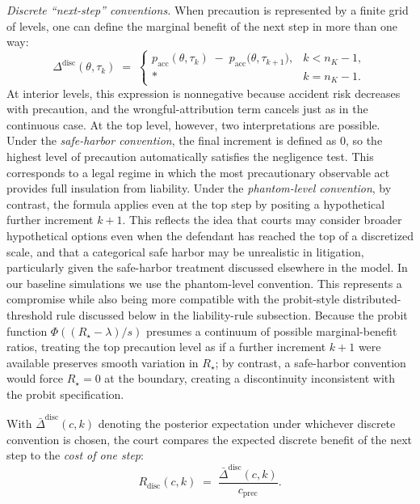 \documentclass{article}
\begin{document}
\medskip
\noindent\emph{Discrete “next-step” conventions.}
When precaution is represented by a finite grid of levels, one can define the marginal benefit of the next step in more than one way:
\[
\Delta^{\mathrm{disc}}(\theta,\tau_k)\;=\;
\begin{cases}
p_{\mathrm{acc}}(\theta,\tau_k)\;-\;p_{\mathrm{acc}}\!\bigl(\theta,\tau_{k+1}\bigr), & k<n_K-1,\\[4pt]
\ast & k=n_K-1.
\end{cases}
\]
At interior levels, this expression is nonnegative because accident risk decreases with precaution, and the wrongful-attribution term cancels just as in the continuous case. At the top level, however, two interpretations are possible. Under the \emph{safe-harbor convention}, the final increment is defined as \(0\), so the highest level of precaution automatically satisfies the negligence test. This corresponds to a legal regime in which the most precautionary observable act provides full insulation from liability. Under the \emph{phantom-level convention}, by contrast, the formula applies even at the top step by positing a hypothetical further increment \(k+1\). This reflects the idea that courts may consider broader hypothetical options even when the defendant has reached the top of a discretized scale, and that a categorical safe harbor may be unrealistic in litigation, particularly given the safe-harbor treatment discussed elsewhere in the model. In our baseline simulations we use the phantom-level convention. This represents a compromise while also being more compatible with the probit-style distributed-threshold rule discussed below in the liability-rule subsection. Because the probit function $\Phi((R_\star-\lambda)/s)$ presumes a continuum of possible marginal-benefit ratios, treating the top precaution level as if a further increment $k+1$ were available preserves smooth variation in $R_\star$; by contrast, a safe-harbor convention would force $R_\star=0$ at the boundary, creating a discontinuity inconsistent with the probit specification.

With \(\bar{\Delta}^{\mathrm{disc}}(c,k)\) denoting the posterior expectation under whichever discrete convention is chosen, the court compares the expected discrete benefit of the next step to the \emph{cost of one step}:
\[
R_{\mathrm{disc}}(c,k)\;=\;\frac{\bar{\Delta}^{\mathrm{disc}}(c,k)}{\,c_{\mathrm{prec}}\,}.
\]
\end{document}
